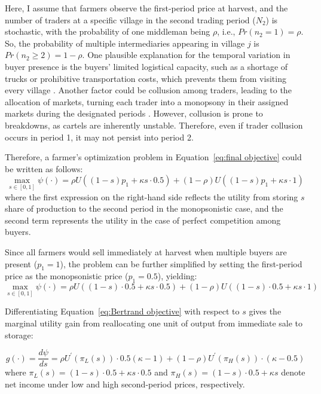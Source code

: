 Here, I assume that farmers observe the first-period price at harvest, and the number of traders at a specific village in the second trading period ($N_2$) is stochastic, with the probability of one middleman being $\rho$, i.e., $Pr(n_2=1)=\rho$. So, the probability of multiple intermediaries appearing in village $j$ is $Pr(n_2 \geq 2) = 1-\rho$. One plausible explanation for the temporal variation in buyer presence is the buyers' limited logistical capacity, such as a shortage of trucks or prohibitive transportation costs, which prevents them from visiting every village \citep{jung2022structural}. Another factor could be collusion among traders, leading to the allocation of markets, turning each trader into a monopsony in their assigned markets during the designated periods \citep{herings2005intertemporal}. However, collusion is prone to breakdowns, as cartels are inherently unstable. Therefore, even if trader collusion occurs in period 1, it may not persist into period 2.

Therefore, a farmer's optimization problem in Equation~\ref{eq:final objective} could be written as follows:
\begin{equation}
\max_{s \in [0,1]} \psi(\cdot) = \rho U((1-s)p_1 + \kappa s \cdot 0.5) + (1-\rho) U \left( (1-s)p_1 +  \kappa s \cdot 1 \right)
\end{equation}
where the first expression on the right-hand side reflects the utility from storing $s$ share of production to the second period in the monopsonistic case, and the second term represents the utility in the case of perfect competition among buyers. 

Since all farmers would sell immediately at harvest when multiple buyers are present ($p_1 = 1$), the problem can be further simplified by setting the first-period price as the monopsonistic price ($p_1 = 0.5$), yielding:
\begin{equation}
\label{eq:Bertrand objective}
\max_{s \in [0,1]} \psi(\cdot) = \rho U((1-s)\cdot0.5 + \kappa s \cdot 0.5) + (1-\rho) U \left( (1-s)\cdot0.5 +  \kappa s \cdot 1 \right)
\end{equation}

Differentiating Equation~\ref{eq:Bertrand objective} with respect to $s$ gives the marginal utility gain from reallocating one unit of output from immediate sale to storage:

\begin{equation}
g(\cdot) = \frac{d\psi}{ds} = \rho U^{\prime}(\pi_L(s)) \cdot 0.5(\kappa-1) + (1 - \rho) U^{\prime}(\pi_H(s)) \cdot (\kappa-0.5)
\label{Eq: bertrand FOC}
\end{equation}
where $\pi_L(s) = (1 - s)\cdot 0.5 + \kappa s \cdot 0.5$ and $\pi_H(s) = (1 - s)\cdot 0.5 + \kappa s$ denote net income under low and high second-period prices, respectively.

